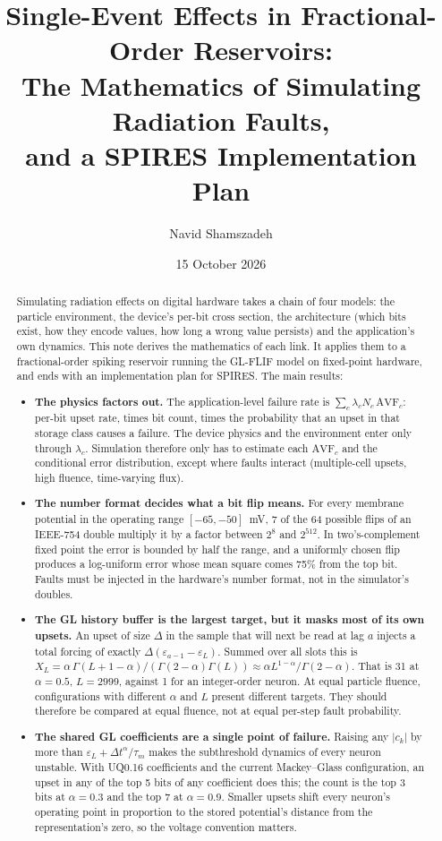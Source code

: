 \documentclass[11pt,a4paper]{article}
\title{Single-Event Effects in Fractional-Order Reservoirs:\\ The Mathematics of Simulating Radiation Faults,\\ and a SPIRES Implementation Plan}
\author{Navid Shamszadeh}
\date{15 October 2026}
\newcommand{\AVF}{\mathrm{AVF}}
\newcommand{\dta}{\Delta t^{\alpha}}
\begin{document}
\maketitle

\begin{abstract}
\noindent
Simulating radiation effects on digital hardware takes a chain of four models: the particle environment, the device's per-bit cross section, the architecture (which bits exist, how they encode values, how long a wrong value persists) and the application's own dynamics. This note derives the mathematics of each link. It applies them to a fractional-order spiking reservoir running the GL-FLIF model on fixed-point hardware, and ends with an implementation plan for SPIRES. The main results:
\begin{itemize}
  \item \textbf{The physics factors out.} The application-level failure rate is $\sum_c \lambda_c N_c\, \AVF_c$: per-bit upset rate, times bit count, times the probability that an upset in that storage class causes a failure. The device physics and the environment enter only through $\lambda_c$. Simulation therefore only has to estimate each $\AVF_c$ and the conditional error distribution, except where faults interact (multiple-cell upsets, high fluence, time-varying flux).
  \item \textbf{The number format decides what a bit flip means.} For every membrane potential in the operating range $[-65,-50]$~mV, 7 of the 64 possible flips of an IEEE-754 double multiply it by a factor between $2^{8}$ and $2^{512}$. In two's-complement fixed point the error is bounded by half the range, and a uniformly chosen flip produces a log-uniform error whose mean square comes 75\% from the top bit. Faults must be injected in the hardware's number format, not in the simulator's doubles.
  \item \textbf{The GL history buffer is the largest target, but it masks most of its own upsets.} An upset of size $\Delta$ in the sample that will next be read at lag $a$ injects a total forcing of exactly $\Delta(\varepsilon_{a-1} - \varepsilon_L)$. Summed over all slots this is $X_L = \alpha\,\Gamma(L+1-\alpha)/(\Gamma(2-\alpha)\Gamma(L)) \approx \alpha L^{1-\alpha}/\Gamma(2-\alpha)$. That is 31 at $\alpha = 0.5$, $L = 2999$, against 1 for an integer-order neuron. At equal particle fluence, configurations with different $\alpha$ and $L$ present different targets. They should therefore be compared at equal fluence, not at equal per-step fault probability.
  \item \textbf{The shared GL coefficients are a single point of failure.} Raising any $|c_k|$ by more than $\varepsilon_L + \dta/\tau_m$ makes the subthreshold dynamics of every neuron unstable. With UQ0.16 coefficients and the current Mackey--Glass configuration, an upset in any of the top 5 bits of any coefficient does this; the count is the top 3 bits at $\alpha = 0.3$ and the top 7 at $\alpha = 0.9$. Smaller upsets shift every neuron's operating point in proportion to the stored potential's distance from the representation's zero, so the voltage convention matters.

\end{itemize}
\end{abstract}
\end{document}
